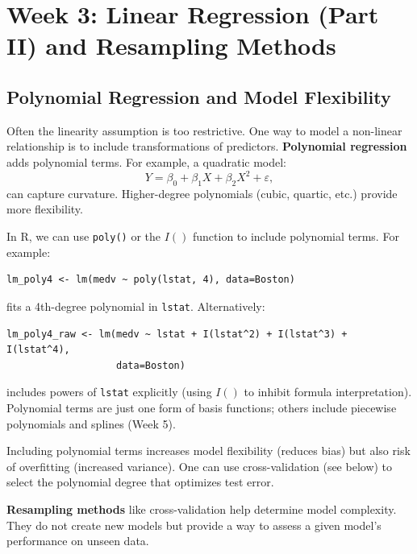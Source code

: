 \documentclass[11pt]{article}
\begin{document}
\section{Week 3: Linear Regression (Part II) and Resampling Methods}
\subsection{Polynomial Regression and Model Flexibility}
Often the linearity assumption is too restrictive. One way to model a non-linear relationship is to include transformations of predictors. \textbf{Polynomial regression} adds polynomial terms. For example, a quadratic model:
\[ Y = \beta_0 + \beta_1 X + \beta_2 X^2 + \varepsilon, \] 
can capture curvature. Higher-degree polynomials (cubic, quartic, etc.) provide more flexibility.

In R, we can use \texttt{poly()} or the $I()$ function to include polynomial terms. For example:
\begin{verbatim}
lm_poly4 <- lm(medv ~ poly(lstat, 4), data=Boston)
\end{verbatim}
fits a 4th-degree polynomial in \texttt{lstat}. Alternatively:
\begin{verbatim}
lm_poly4_raw <- lm(medv ~ lstat + I(lstat^2) + I(lstat^3) + I(lstat^4),
                   data=Boston)
\end{verbatim}
includes powers of \texttt{lstat} explicitly (using $I()$ to inhibit formula interpretation). Polynomial terms are just one form of basis functions; others include piecewise polynomials and splines (Week 5).

Including polynomial terms increases model flexibility (reduces bias) but also risk of overfitting (increased variance). One can use cross-validation (see below) to select the polynomial degree that optimizes test error.

\textbf{Resampling methods} like cross-validation help determine model complexity. They do not create new models but provide a way to assess a given model’s performance on unseen data.
\end{document}
